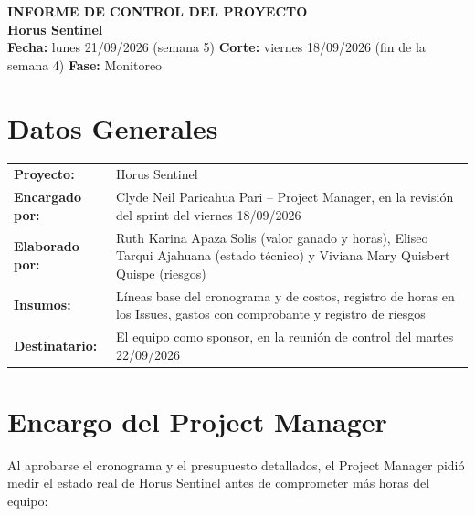 \documentclass[11pt,a4paper]{article}
\begin{document}
\begin{center}
    {\Large \textbf{\textcolor{AzulUNA}{INFORME DE CONTROL DEL PROYECTO}}}\\[3pt]
    {\normalsize \textbf{Horus Sentinel}}\\[4pt]
    \footnotesize \textbf{Fecha:} lunes 21/09/2026 (semana 5) \quad \textbar\quad \textbf{Corte:} viernes 18/09/2026 (fin de la semana 4) \quad \textbar\quad \textbf{Fase:} Monitoreo
\end{center}

\vspace{0.1cm}

\section{Datos Generales}
\noindent\begin{tabularx}{\textwidth}{@{}P{4.2cm} L@{}}
\toprule
\textbf{Proyecto:} & Horus Sentinel \\
\textbf{Encargado por:} & Clyde Neil Paricahua Pari -- Project Manager, en la revisión del sprint del viernes 18/09/2026 \\
\textbf{Elaborado por:} & Ruth Karina Apaza Solis (valor ganado y horas), Eliseo Tarqui Ajahuana (estado técnico) y Viviana Mary Quisbert Quispe (riesgos) \\
\textbf{Insumos:} & Líneas base del cronograma y de costos, registro de horas en los Issues, gastos con comprobante y registro de riesgos \\
\textbf{Destinatario:} & El equipo como sponsor, en la reunión de control del martes 22/09/2026 \\
\bottomrule
\end{tabularx}

\section{Encargo del Project Manager}
Al aprobarse el cronograma y el presupuesto detallados, el Project Manager pidió medir el estado real de Horus Sentinel antes de comprometer más horas del equipo:
\end{document}
